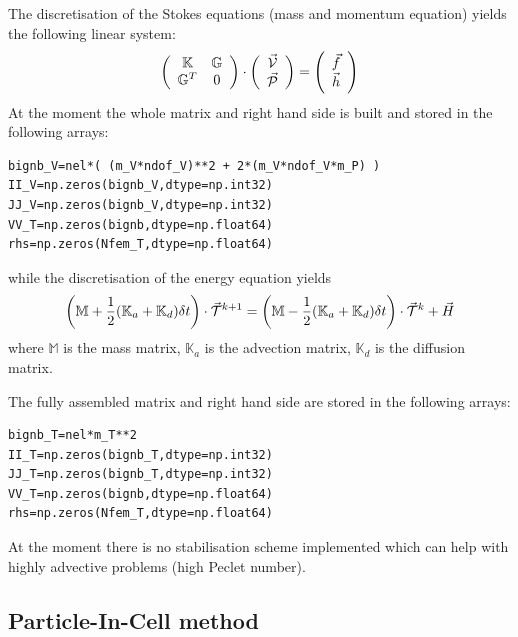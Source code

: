 \documentclass[a4paper,12pt]{article}
\newcommand{\K}{{\mathbb{K}}}
\newcommand{\G}{{\mathbb{G}}}
\newcommand{\M}{{\mathbb{M}}}
\begin{document}
The discretisation of the Stokes equations (mass and momentum equation)
yields the following linear system:
\[
\left(\begin{array}{cc}
\K & \G \\
\G^T & 0
\end{array}
\right)
\cdot
\left(
\begin{array}{c}
\vec{\cal V} \\
\vec{\cal P} 
\end{array}
\right)
=
\left(
\begin{array}{c}
\vec{f} \\
\vec{h} 
\end{array}
\right)
\]
At the moment the whole matrix and right hand side is built and stored in the 
following arrays:
\begin{lstlisting}
bignb_V=nel*( (m_V*ndof_V)**2 + 2*(m_V*ndof_V*m_P) )
II_V=np.zeros(bignb_V,dtype=np.int32)    
JJ_V=np.zeros(bignb_V,dtype=np.int32)    
VV_T=np.zeros(bignb,dtype=np.float64)    
rhs=np.zeros(Nfem_T,dtype=np.float64)
\end{lstlisting}

while the discretisation of the energy equation yields
\[
\left(\M + \frac12 (\K_a + \K_d) \delta t \right) \cdot \vec{\cal T}^{k+1}
= \left(\M - \frac12 (\K_a + \K_d) \delta t \right) \cdot \vec{\cal T}^k + \vec{H}
\]
where $\M$ is the mass matrix, $\K_a$ is the advection matrix, 
$\K_d$ is the diffusion matrix.

The fully assembled matrix and right hand side are stored in the following arrays: 
\begin{lstlisting}
bignb_T=nel*m_T**2 
II_T=np.zeros(bignb_T,dtype=np.int32)    
JJ_T=np.zeros(bignb_T,dtype=np.int32)    
VV_T=np.zeros(bignb,dtype=np.float64)    
rhs=np.zeros(Nfem_T,dtype=np.float64)
\end{lstlisting}



At the moment there is no stabilisation scheme implemented which can help 
with highly advective problems (high Peclet number).


\subsection{Particle-In-Cell method}
\end{document}
